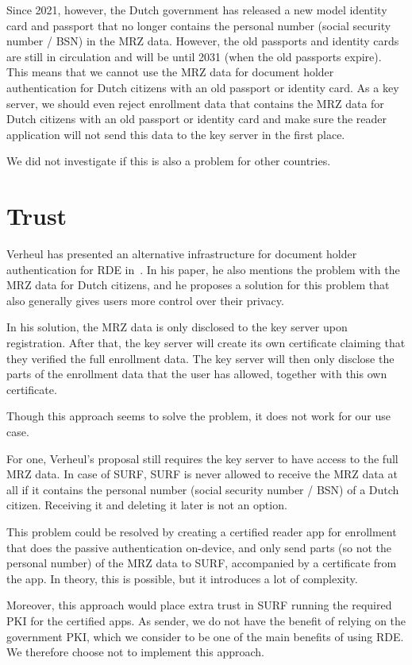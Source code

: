Since 2021, however, the Dutch government has released a new model identity card and passport that no longer contains the personal number (social security number / BSN) in the MRZ data.
However, the old passports and identity cards are still in circulation and will be until 2031 (when the old passports expire).
This means that we cannot use the MRZ data for document holder authentication for Dutch citizens with an old passport or identity card.
As a key server, we should even reject enrollment data that contains the MRZ data for Dutch citizens with an old passport or identity card and make sure the reader application will not send this data to the key server in the first place.

We did not investigate if this is also a problem for other countries.

\section{Trust}\label{sec:trust}
Verheul has presented an alternative infrastructure for document holder authentication for RDE in~\cite{verheul2020secure}.
In his paper, he also mentions the problem with the MRZ data for Dutch citizens, and he proposes a solution for this problem that also generally gives users more control over their privacy.

In his solution, the MRZ data is only disclosed to the key server upon registration.
After that, the key server will create its own certificate claiming that they verified the full enrollment data.
The key server will then only disclose the parts of the enrollment data that the user has allowed, together with this own certificate.

Though this approach seems to solve the problem, it does not work for our use case.

For one, Verheul's proposal still requires the key server to have access to the full MRZ data.
In case of SURF, SURF is never allowed to receive the MRZ data at all if it contains the personal number (social security number / BSN) of a Dutch citizen.
Receiving it and deleting it later is not an option.

This problem could be resolved by creating a certified reader app for enrollment that does the passive authentication on-device, and only send parts (so not the personal number) of the MRZ data to SURF, accompanied by a certificate from the app.
In theory, this is possible, but it introduces a lot of complexity.

Moreover, this approach would place extra trust in SURF running the required PKI for the certified apps.
As sender, we do not have the benefit of relying on the government PKI, which we consider to be one of the main benefits of using RDE.
We therefore choose not to implement this approach.

